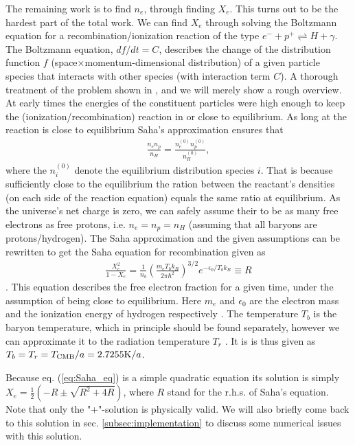 \documentclass[twocolumn]{aastex62}
\begin{document}
The remaining work is to find $n_e$, through finding $X_e$. This turns out to be the hardest part of the total work. We can find $X_e$ through solving the Boltzmann equation for a recombination/ionization reaction of the type $e^{-} + p^{+} \rightleftharpoons H + \gamma$. The Boltzmann equation, $df/dt = C$, describes the change of the distribution function $f$ (space$\times$momentum-dimensional distribution) of a given particle species that interacts with other species (with interaction term $C$). A thorough treatment of the problem shown in \cite{dodelson:2003}, and we will merely show a rough overview. At early times the energies of the constituent particles were high enough to keep the (ionization/recombination) reaction in or close to equilibrium. As long at the reaction is close to equilibrium Saha's approximation \citep[p. 70]{dodelson:2003} ensures that 
\begin{align}
    \frac{n_e n_p}{n_H} = \frac{n_e^{(0)}n_p^{(0)}}{n_H^{(0)}},
\end{align}
where the $n_i^{(0)}$ denote the equilibrium distribution species $i$. That is because sufficiently close to the equilibrium the ration between the reactant's densities (on each side of the reaction equation) equals the same ratio at equilibrium. As the universe's net charge is zero, we can safely assume their to be as many free electrons as free protons, i.e. $n_e = n_p = n_H$ (assuming that all baryons are protons/hydrogen). The Saha approximation and the given assumptions can be rewritten to get the Saha equation for recombination given as 
\begin{align}
    \frac{X_e^2}{1 - X_e} = \frac{1}{n_b} \left(\frac{m_e
    T_bk_B}{2\pi\hbar^2}\right)^{3/2} e^{-\epsilon_0/T_bk_B} \equiv R
    \label{eq:Saha_eq}
\end{align}
\citep[p. 70]{dodelson:2003}. This equation describes the free electron fraction for a given time, under the assumption of being close to equilibrium.
Here $m_e$ and $\epsilon_0$ are the electron mass and the ionization energy of hydrogen respectively \citep[]{winther:2020}. The temperature $T_b$ is the baryon temperature, which in principle should be found separately, however we can approximate it to the radiation temperature $T_r$ \citep[]{winther:2020}. It is is thus given as $T_b =
T_r = T_{\rm CMB} / a = 2.7255 \textrm{K} / a$.

Because eq. (\ref{eq:Saha_eq}) is a simple quadratic equation its solution is simply 
$X_e = \frac{1}{2} (-R \pm \sqrt{R^2 + 4R})$, where $R$ stand for the r.h.s. of Saha's equation. Note that only the "+"-solution is physically valid. We will also briefly come back to this solution in sec. \ref{subsec:implementation} to discuss some numerical issues with this solution.
\end{document}
